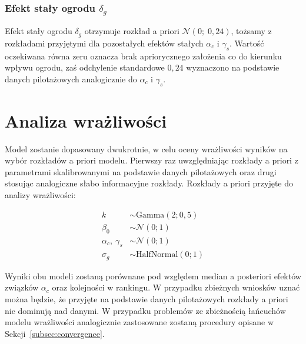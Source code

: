 \documentclass[12pt, a4paper]{article}
\begin{document}
\subsubsection{Efekt stały ogrodu $\delta_g$}

Efekt stały ogrodu $\delta_g$ otrzymuje rozkład a priori $\mathcal{N}(0;\; 0{,}24)$, tożsamy z rozkładami przyjętymi dla pozostałych efektów stałych $\alpha_c$ i $\gamma_s$. Wartość oczekiwana równa zeru oznacza brak apriorycznego założenia co do kierunku wpływu ogrodu, zaś odchylenie standardowe $0{,}24$ wyznaczono na podstawie danych pilotażowych analogicznie do $\alpha_c$ i $\gamma_s$.

\section{Analiza wrażliwości}\label{sec:sensitivity_analysis}
Model zostanie dopasowany dwukrotnie, w celu oceny wrażliwości wyników na wybór rozkładów a priori modelu. Pierwszy raz uwzględniając rozkłady a priori z parametrami skalibrowanymi na podstawie danych pilotażowych oraz drugi stosując analogiczne słabo informacyjne rozkłady. Rozkłady a priori przyjęte do analizy wrażliwości:

\begin{align}
    k &\sim \mathrm{Gamma}(2; 0{,}5) \\
    \beta_0 &\sim \mathcal{N}(0; 1) \\
    \alpha_c,\ \gamma_s &\sim \mathcal{N}(0; 1) \\
    \sigma_g &\sim \mathrm{HalfNormal}(0; 1)
\end{align}

Wyniki obu modeli zostaną porównane pod względem median a posteriori efektów związków $\alpha_c$ oraz kolejności w rankingu. W przypadku zbieżnych wniosków uznać można będzie, że przyjęte na podstawie danych pilotażowych rozkłady a priori nie dominują nad danymi. W przypadku problemów ze zbieżnością łańcuchów modelu wrażliwości analogicznie zastosowane zostaną procedury opisane w Sekcji~\ref{subsec:convergence}.
\end{document}
